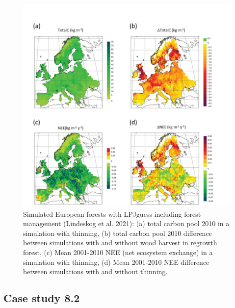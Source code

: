 \documentclass[12pt,oneside]{book}
\begin{document}
\begin{figure}

{\centering \includegraphics[width=0.8\linewidth]{figures/chap8/f815_LPJ_manag_result} 

}

\caption{Simulated European forests with LPJguess including forest management (Lindeskog et al. 2021): (a) total carbon pool 2010 in a simulation with thinning, (b) total carbon pool 2010 difference between simulations with and without wood harvest in regrowth forest, (c) Mean 2001-2010 NEE (net ecosystem exchange) in a simulation with thinning, (d) Mean 2001-2010 NEE difference between simulations with and without thinning.}\label{fig:f815}
\end{figure}

\subsection{Case study 8.2}\label{case-study-8.2}
\end{document}
